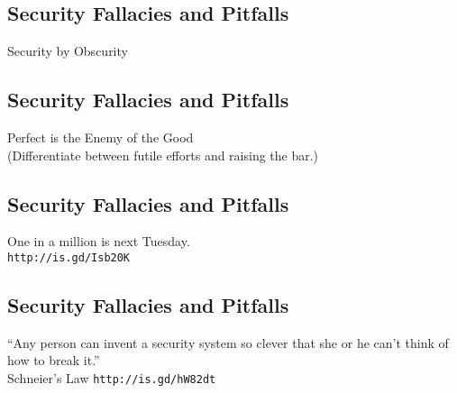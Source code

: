\documentclass[xga]{xdvislides}
\begin{document}
\subsection{Security Fallacies and Pitfalls}
\vspace*{\fill}
\begin{center}
    \Hugesize
        Security by Obscurity
\end{center}
\vspace*{\fill}

\subsection{Security Fallacies and Pitfalls}
\vspace*{\fill}
\begin{center}
    \Hugesize
        Perfect is the Enemy of the Good \\
	\vspace{.25in}
	\Normalsize
	(Differentiate between futile efforts and raising the bar.)
\end{center}
\vspace*{\fill}

\subsection{Security Fallacies and Pitfalls}
\vspace*{\fill}
\begin{center}
    \Hugesize
        One in a million is next Tuesday. \\
	\vspace{.25in}
	\Normalsize
	\verb+http://is.gd/Isb20K+
\end{center}
\vspace*{\fill}

\subsection{Security Fallacies and Pitfalls}
\vspace*{\fill}
\begin{center}
    \Hugesize
        ``Any person can invent a security system so clever that she or he
can't think of how to break it.'' \\
	\vspace{.25in}
	\Normalsize
	Schneier's Law \verb+http://is.gd/hW82dt+
\end{center}
\vspace*{\fill}
\end{document}
